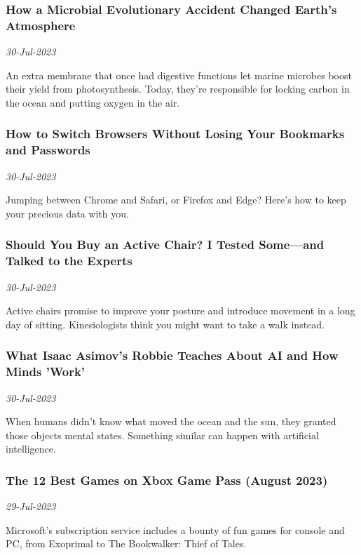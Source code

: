 \subsubsection{How a Microbial Evolutionary Accident Changed Earth's Atmosphere \href{https://www.wired.com/story/how-a-microbial-evolutionary-accident-changed-earths-atmosphere/}{}}
\textit{30-Jul-2023}

An extra membrane that once had digestive functions let marine microbes boost their yield from photosynthesis. Today, they're responsible for locking carbon in the ocean and putting oxygen in the air.
\subsubsection{How to Switch Browsers Without Losing Your Bookmarks and Passwords \href{https://www.wired.com/story/switch-browsers-without-losing-bookmarks-passwords/}{}}
\textit{30-Jul-2023}

Jumping between Chrome and Safari, or Firefox and Edge? Here’s how to keep your precious data with you.
\subsubsection{Should You Buy an Active Chair? I Tested Some—and Talked to the Experts \href{https://www.wired.com/story/should-you-buy-an-active-chair/}{}}
\textit{30-Jul-2023}

Active chairs promise to improve your posture and introduce movement in a long day of sitting. Kinesiologists think you might want to take a walk instead.
\subsubsection{What Isaac Asimov’s Robbie Teaches About AI and How Minds 'Work' \href{https://www.wired.com/story/artificial-intelligence-minds-science-fiction/}{}}
\textit{30-Jul-2023}

When humans didn't know what moved the ocean and the sun, they granted those objects mental states. Something similar can happen with artificial intelligence.
\subsubsection{The 12 Best Games on Xbox Game Pass (August 2023) \href{https://www.wired.com/gallery/best-xbox-game-pass-games/}{}}
\textit{29-Jul-2023}

Microsoft’s subscription service includes a bounty of fun games for console and PC, from Exoprimal to The Bookwalker: Thief of Tales.
